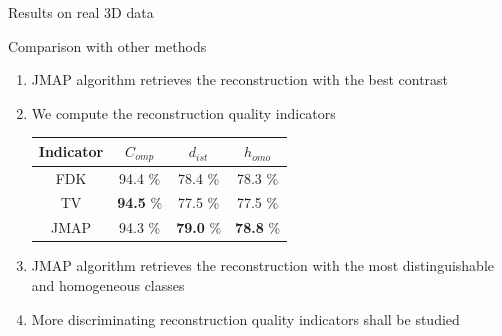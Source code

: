 \documentclass[latex]{beamer}
\begin{document}
\begin{frame}{Results on real 3D data}
\begin{block}{Comparison with other methods}
\begin{enumerate}
\item JMAP algorithm retrieves the reconstruction with the best contrast
\item We compute the reconstruction quality indicators
\begin{table}[htb]
\begin{center}
\begin{tabular}{|*{4}{c|}}
\hline
\textbf{Indicator} & $C_{omp}$ & $d_{ist}$ & $h_{omo}$  \\
\hline
FDK & 94.4 \% & 78.4 \% & 78.3 \% \\
\hline
TV & \textbf{94.5} \% & 77.5 \% & 77.5 \% \\
\hline
JMAP & 94.3 \% & \textbf{79.0} \% & \textbf{78.8} \% \\
\hline
\end{tabular}
\end{center}
\label{tab:Comparison of FDK and JMAP using reconstruction quality indicators}
\end{table} 
\item JMAP algorithm retrieves the reconstruction with the most distinguishable and homogeneous classes
\item More discriminating reconstruction quality indicators shall be studied
\end{enumerate}
\end{block}
\end{frame}
\end{document}
